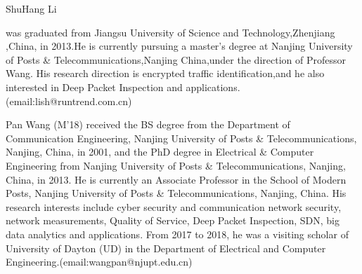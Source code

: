 \documentclass[conference]{IEEEtran}
\begin{document}
\begin{IEEEbiography}{ShuHang Li}

 was graduated from Jiangsu University of Science and Technology,Zhenjiang ,China, in 2013.He is currently pursuing a master's degree at Nanjing University of Posts \& Telecommunications,Nanjing China,under the direction of Professor Wang. His research direction is encrypted traffic identification,and he also interested in Deep Packet Inspection and applications.(email:lish@runtrend.com.cn)

\end{IEEEbiography}
\vspace{-30ex}
\begin{IEEEbiography}{Pan Wang}
(M'18) received the BS degree from the Department of Communication Engineering, Nanjing University of Posts \& Telecommunications, Nanjing, China, in 2001, and the PhD degree in Electrical \& Computer Engineering from Nanjing University of Posts \& Telecommunications, Nanjing, China, in 2013. He is currently an Associate Professor in the School of Modern Posts, Nanjing University of Posts \& Telecommunications, Nanjing, China. His research interests include cyber security and communication network security, network measurements, Quality of Service, Deep Packet Inspection, SDN, big data analytics and applications. From 2017 to 2018, he was a visiting scholar of University of Dayton (UD) in the Department of Electrical and Computer Engineering.(email:wangpan@njupt.edu.cn)

\end{IEEEbiography}
\end{document}
